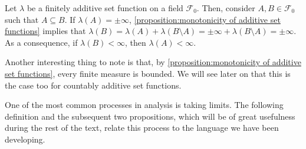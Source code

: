 \begin{remk}\label{remark:finiteness of subsets} Let \(\lambda\) be a
finitely additive set function on a field \(\mathcal{F}_0\). Then, consider \(A,B\in\mathcal{F}_0\) such that \(A\subseteq B\). If
\(\lambda(A)=\pm\infty\), \ref{proposition:monotonicity of additive set
functions} implies that
\(\lambda(B)=\lambda(A)+\lambda(B\setminus A)=\pm\infty+\lambda(B\setminus A)=\pm\infty\).
As a consequence, if \(\lambda(B)<\infty\), then \(\lambda(A)<\infty\).
		
		Another interesting thing to note is that, by
\cref{proposition:monotonicity of additive set functions}, every finite measure
is bounded. We will see later on that this is the case too for countably
additive set functions.
\end{remk}
One of the most common processes in analysis is taking limits. The following definition and the subsequent two propositions, which will be of great usefulness during the rest of the text, relate this process to the language we have been developing.
	
